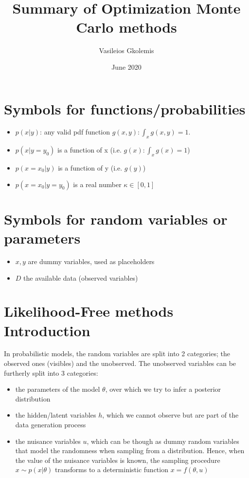 \documentclass{article}
\title{Summary of Optimization Monte Carlo methods}
\author{Vasileios Gkolemis}
\date{June 2020}
\begin{document}
\maketitle

\section{Symbols for functions/probabilities}\label{sec:symbols-functions}

\begin{itemize}
    \item $p(x|y)$: any valid pdf function $g(x,y): \int_x g(x,y) = 1$. 
    \item $p(x|y=y_0)$ is a function of x (i.e. $g(x): \int_x g(x) = 1$)  
    \item $p(x=x_0|y)$ is a function of y (i.e. $g(y)$) 
    \item $p(x=x_0|y=y_0)$ is a real number $\kappa \in [0,1]$
\end{itemize}

\section{Symbols for random variables or parameters} \label{sec:symbols-random_variables}

\begin{itemize}
    \item $x, y$ are dummy variables, used as placeholders
    \item $D$ the available data (observed variables)
\end{itemize}


\section{Likelihood-Free methods Introduction}\label{sec:likelihood-free-methods-introduction}

In probabilistic models, the random variables are split into 2 categories;
the observed ones (visibles) and the unobserved.
The unobserved variables can be furtherly split into 3 categories:

\begin{itemize}
    \item the parameters of the model $\theta$, over which we try to infer a posterior distribution
    \item the hidden/latent variables $h$, which we cannot observe but are part of the data generation process
    \item the nuisance variables $u$, which can be though as dummy random variables that model the randomness when sampling from a distribution.
    Hence, when the value of the nuisance variables is known, the sampling procedure $x \sim p(x|\theta)$ transforms to a deterministic function $x = f(\theta,u)$
\end{itemize}
\end{document}
